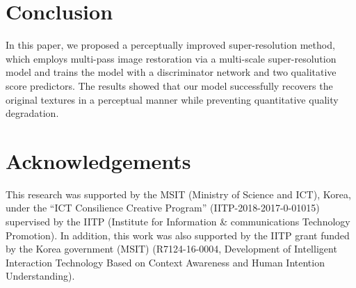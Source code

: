 \documentclass[runningheads]{llncs}
\begin{document}
\section{Conclusion}
\label{sec:conclusion}

In this paper, we proposed a perceptually improved super-resolution method, which employs multi-pass image restoration via a multi-scale super-resolution model and trains the model with a discriminator network and two qualitative score predictors.
The results showed that our model successfully recovers the original textures in a perceptual manner while preventing quantitative quality degradation.


\section*{Acknowledgements}

This research was supported by the MSIT (Ministry of Science and ICT), Korea, under the ``ICT Consilience Creative Program'' (IITP-2018-2017-0-01015) supervised by the IITP (Institute for Information \& communications Technology Promotion). In addition, this work was also supported by the IITP grant funded by the Korea government (MSIT) (R7124-16-0004, Development of Intelligent Interaction Technology Based on Context Awareness and Human Intention Understanding).



\end{document}
